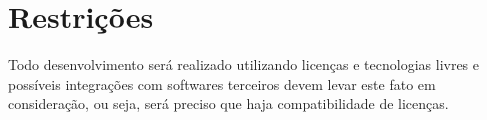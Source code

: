 %
%        
%         
%			
%
%
%			
%


\section{Restrições}\label{sec:restrições}
Todo desenvolvimento será realizado utilizando licenças e tecnologias livres e possíveis integrações com softwares terceiros devem levar este fato em consideração, ou seja, será preciso que haja compatibilidade de licenças.